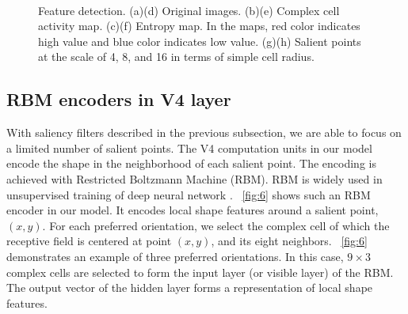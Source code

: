 \documentclass[twocolumn]{article}
\begin{document}
\begin{figure}
\\
\hfil
{}
\caption{Feature detection. (a)(d) Original images.
(b)(e) Complex cell activity map. 
(c)(f) Entropy map.
In the maps, red color indicates high value and blue color indicates low value.
(g)(h) Salient points at the scale of 4, 8, and 16 in terms of simple cell radius.}
\label{fig:5}
\end{figure}

\subsection{RBM encoders in V4 layer}

With saliency filters described in the previous subsection, we are able to focus on a limited number of salient points.
The V4 computation units in our model encode the shape in the neighborhood of each salient point.
The encoding is achieved with Restricted Boltzmann Machine (RBM).
RBM is widely used in unsupervised training of deep neural network \cite{bengio2009}.
\figurename~\ref{fig:6} shows such an RBM encoder in our model.
It encodes local shape features around a salient point, $(x,y)$.
For each preferred orientation, we select the complex cell of which the receptive field is centered at point $(x,y)$, and its eight neighbors.
\figurename~\ref{fig:6} demonstrates an example of three preferred orientations.
In this case, $9\times3$ complex cells are selected to form the input layer (or visible layer) of the RBM.
The output vector of the hidden layer forms a representation of local shape features.
\end{document}
